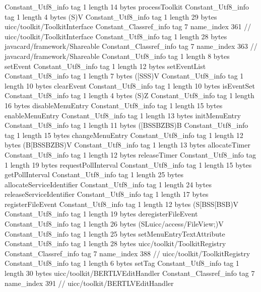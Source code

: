 {{{		}
		Constant_Utf8_info {
			tag	1
			length	14
			bytes	processToolkit
		}
		Constant_Utf8_info {
			tag	1
			length	4
			bytes	(S)V
		}
		Constant_Utf8_info {
			tag	1
			length	29
			bytes	uicc/toolkit/ToolkitInterface
		}
		Constant_Classref_info {
			tag	7
			name_index	361		// uicc/toolkit/ToolkitInterface
		}
		Constant_Utf8_info {
			tag	1
			length	28
			bytes	javacard/framework/Shareable
		}
		Constant_Classref_info {
			tag	7
			name_index	363		// javacard/framework/Shareable
		}
		Constant_Utf8_info {
			tag	1
			length	8
			bytes	setEvent
		}
		Constant_Utf8_info {
			tag	1
			length	12
			bytes	setEventList
		}
		Constant_Utf8_info {
			tag	1
			length	7
			bytes	([SSS)V
		}
		Constant_Utf8_info {
			tag	1
			length	10
			bytes	clearEvent
		}
		Constant_Utf8_info {
			tag	1
			length	10
			bytes	isEventSet
		}
		Constant_Utf8_info {
			tag	1
			length	4
			bytes	(S)Z
		}
		Constant_Utf8_info {
			tag	1
			length	16
			bytes	disableMenuEntry
		}
		Constant_Utf8_info {
			tag	1
			length	15
			bytes	enableMenuEntry
		}
		Constant_Utf8_info {
			tag	1
			length	13
			bytes	initMenuEntry
		}
		Constant_Utf8_info {
			tag	1
			length	11
			bytes	([BSSBZBS)B
		}
		Constant_Utf8_info {
			tag	1
			length	15
			bytes	changeMenuEntry
		}
		Constant_Utf8_info {
			tag	1
			length	12
			bytes	(B[BSSBZBS)V
		}
		Constant_Utf8_info {
			tag	1
			length	13
			bytes	allocateTimer
		}
		Constant_Utf8_info {
			tag	1
			length	12
			bytes	releaseTimer
		}
		Constant_Utf8_info {
			tag	1
			length	19
			bytes	requestPollInterval
		}
		Constant_Utf8_info {
			tag	1
			length	15
			bytes	getPollInterval
		}
		Constant_Utf8_info {
			tag	1
			length	25
			bytes	allocateServiceIdentifier
		}
		Constant_Utf8_info {
			tag	1
			length	24
			bytes	releaseServiceIdentifier
		}
		Constant_Utf8_info {
			tag	1
			length	17
			bytes	registerFileEvent
		}
		Constant_Utf8_info {
			tag	1
			length	12
			bytes	(S[BSS[BSB)V
		}
		Constant_Utf8_info {
			tag	1
			length	19
			bytes	deregisterFileEvent
		}
		Constant_Utf8_info {
			tag	1
			length	26
			bytes	(SLuicc/access/FileView;)V
		}
		Constant_Utf8_info {
			tag	1
			length	25
			bytes	setMenuEntryTextAttribute
		}
		Constant_Utf8_info {
			tag	1
			length	28
			bytes	uicc/toolkit/ToolkitRegistry
		}
		Constant_Classref_info {
			tag	7
			name_index	388		// uicc/toolkit/ToolkitRegistry
		}
		Constant_Utf8_info {
			tag	1
			length	6
			bytes	setTag
		}
		Constant_Utf8_info {
			tag	1
			length	30
			bytes	uicc/toolkit/BERTLVEditHandler
		}
		Constant_Classref_info {
			tag	7
			name_index	391		// uicc/toolkit/BERTLVEditHandler
}}}
